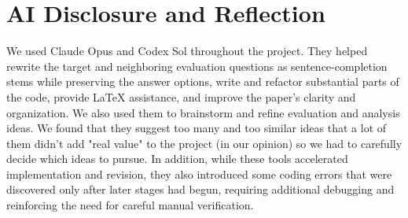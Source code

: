 \section*{AI Disclosure and Reflection}

We used Claude Opus and Codex Sol throughout the project. They helped rewrite
the target and neighboring evaluation questions as sentence-completion stems
while preserving the answer options, write and refactor substantial parts of the code, provide
LaTeX assistance, and improve the paper's clarity and organization. We also
used them to brainstorm and refine evaluation and analysis ideas.
We found that they suggest too many and too similar ideas that a lot
of them didn't add "real value" to the project (in our opinion) so we 
had to carefully decide which ideas to pursue. In addition, 
while these tools accelerated implementation and revision, they also
introduced some coding errors that were discovered only after later stages had begun, requiring additional debugging and
reinforcing the need for careful manual verification.

